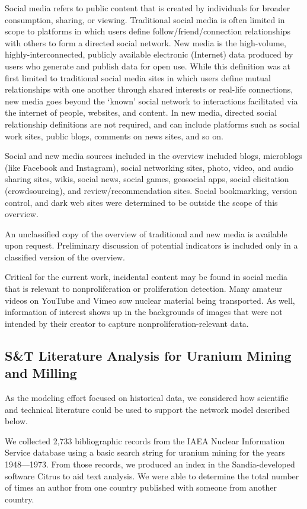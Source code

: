 \documentclass{article} %
\begin{document}
Social media refers to public content that is created by individuals for broader consumption, sharing, or viewing. Traditional social media is often limited in scope to platforms in which users define follow/friend/connection relationships with others to form a directed social network. New media is the high-volume, highly-interconnected, publicly available electronic (Internet) data produced by users who generate and publish data for open use. While this definition was at first limited to traditional social media sites in which users define mutual relationships with one another through shared interests or real-life connections, new media goes beyond the `known' social network to interactions facilitated via the internet of people, websites, and content. In new media, directed social relationship definitions are not required, and can include platforms such as social work sites, public blogs, comments on news sites, and so on. 

Social and new media sources included in the overview included blogs, microblogs (like Facebook and Instagram), social networking sites, photo, video, and audio sharing sites, wikis, social news, social games, geosocial apps, social elicitation (crowdsourcing), and review/recommendation sites. Social bookmarking, version control, and dark web sites were determined to be outside the scope of this overview.

An unclassified copy of the overview of traditional and new media is available upon request. Preliminary discussion of potential indicators is included only in a classified version of the overview.

Critical for the current work, incidental content may be found in social media that is relevant to nonproliferation or proliferation detection. Many amateur videos on YouTube and Vimeo sow nuclear material being transported. As well, information of interest shows up in the backgrounds of images that were not intended by their creator to capture nonproliferation-relevant data.

\subsection{S\&T Literature Analysis for Uranium Mining and Milling}
As the modeling effort focused on historical data, we considered how scientific and technical literature could be used to support the network  model described below. 

We collected 2,733 bibliographic records from the IAEA Nuclear Information Service database using a basic search string for uranium mining for the years 1948---1973.  From those records, we produced an index in the Sandia-developed software Citrus to aid  text analysis. We were able to determine the total number of times an author from one country published with someone from another country. 
\end{document}
